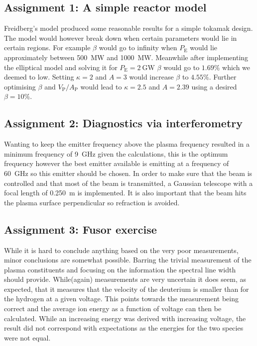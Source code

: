 
\subsection{Assignment 1: A simple reactor model}

Freidberg's model produced some reasonable results for a simple tokamak design. The model would however break down when certain parameters would lie in certain regions. For example $\beta$ would go to infinity when $P_{\mathrm{E}}$ would lie approximately between \SI{500}{\mega\watt} and \SI{1000}{\mega\watt}. Meanwhile after implementing the elliptical model and solving it for $P_{\mathrm{E}}=\SI{2}{\giga\watt}$ $\beta$ would go to $1.69\%$ which we deemed to low. Setting $\kappa=2$ and $A=3$ would increase $\beta$ to $4.55\%$. Further optimising $\beta$ and $V_{\mathrm{P}}/A_{\mathrm{P}}$ would lead to $\kappa=2.5$ and $A=2.39$ using a desired $\beta=10\%$.

\subsection{Assignment 2: Diagnostics via interferometry}

Wanting to keep the emitter frequency above the plasma frequency resulted in a minimum frequency of \SI{9}{\giga\hertz} given the calculations, this is the optimum frequency however the best emitter available is emitting at a frequency of \SI{60}{\giga\hertz} so this emitter should be chosen. In order to make sure that the beam is controlled and that most of the beam is transmitted, a Gaussian telescope with a focal length of \SI{0.250}{\meter} is implemented. It is also important that the beam hits the plasma surface perpendicular so refraction is avoided.

\subsection{Assignment 3: Fusor exercise}
While it is hard to conclude anything based on the very poor measurements, minor conclusions are somewhat possible. Barring the trivial measurement of the plasma constituents and focusing on the information the spectral line width should provide. While(again) measurements are very uncertain it does seem, as expected, that it measures that the velocity of the deuterium is smaller than for the hydrogen at a given voltage. This points towards the measurement being correct and the average ion energy as a function of voltage can then be calculated. While an increasing energy was derived with increasing voltage, the result did not correspond with expectations as the energies for the two species were not equal.